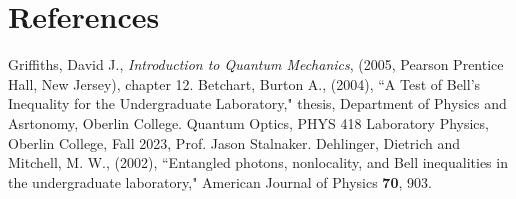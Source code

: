\documentclass[11pt,letterpaper]{article}
\begin{document}
\section{References}

\begin{thebibliography}{99}
 Griffiths, David J., \textit{Introduction to Quantum Mechanics}, (2005, Pearson Prentice Hall, New Jersey), chapter 12.
 Betchart, Burton A., (2004), ``A Test of Bell's Inequality for the Undergraduate Laboratory," thesis, Department of Physics and Asrtonomy, Oberlin College.
 Quantum Optics, PHYS 418 Laboratory Physics, Oberlin College, Fall 2023, Prof. Jason Stalnaker.
 Dehlinger, Dietrich and Mitchell, M. W., (2002), ``Entangled photons, nonlocality, and Bell inequalities in the undergraduate laboratory," American Journal of Physics \textbf{70}, 903.

\end{thebibliography}
\end{document}
